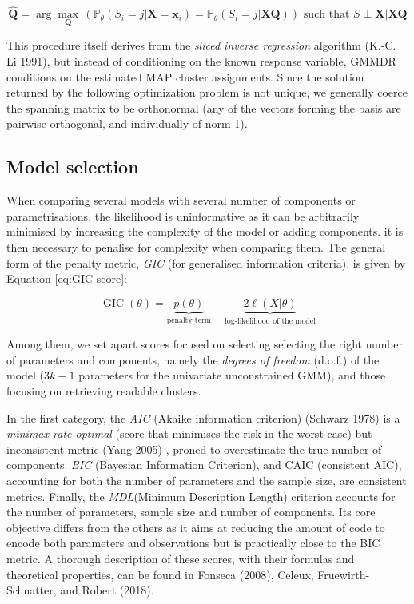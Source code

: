 \begin{equation}
 \hat{\boldsymbol{Q}} = \arg \max_{\boldsymbol{Q}} \,  \left(\mathbb{P}_{\theta} (S_i=j | \boldsymbol{X} =\boldsymbol{x}_i) = \mathbb{P}_{\theta} (S_i=j | \boldsymbol{X} \boldsymbol{Q}) \right)
\text{ such that } S \perp \boldsymbol{X} | \boldsymbol{X} \boldsymbol{Q}
    \label{eq:GMMDR}
\end{equation}

This procedure itself derives from the \emph{sliced inverse regression} algorithm (K.-C. Li 1991), but instead of conditioning on the known response variable, GMMDR conditions on the estimated MAP cluster assignments. Since the solution returned by the following optimization problem is not unique, we generally coerce the spanning matrix to be orthonormal (any of the vectors forming the basis are pairwise orthogonal, and individually of norm 1).
\color{black}

\hypertarget{model-selection}{%
\subsection{Model selection}\label{model-selection}}

When comparing several models with several number of components or
parametrisations, the likelihood is uninformative as it can be
arbitrarily minimised by increasing the complexity of the model or
adding components. it is then necessary to penalise for complexity when
comparing them. The general form of the penalty metric, \emph{GIC} (for
generalised information criteria), is given by Equation
\eqref{eq:GIC-score}:

\begin{equation}
    \operatorname{GIC} (\theta) =  \underbrace{p(\theta)}_{\text{penalty term}} - \underbrace{2 \ell (X | \theta)}_{\text{log-likelihood of the model}}
\label{eq:GIC-score}
\end{equation}

Among them, we set apart scores focused on selecting selecting the right
number of parameters and components, namely the \emph{degrees of freedom}
(d.o.f.) of the model (\(3k-1\) parameters for the univariate
unconstrained GMM), and those focusing on retrieving readable clusters.

In the first category, the \emph{AIC} (Akaike information criterion)
(Schwarz 1978) is a \emph{minimax-rate optimal} (score that minimises the risk
in the worst case) but inconsistent metric (Yang 2005) , proned to
overestimate the true number of components. \emph{BIC} (Bayesian Information
Criterion), and CAIC (consistent AIC), accounting for both the number of
parameters and the sample size, are consistent metrics. Finally, the
\emph{MDL}(Minimum Description Length) criterion accounts for the number of
parameters, sample size and number of components. Its core objective
differs from the others as it aims at reducing the amount of code to
encode both parameters and observations but is practically close to the
BIC metric. A thorough description of these scores, with their formulas
and theoretical properties, can be found in Fonseca (2008), Celeux, Fruewirth-Schnatter, and Robert (2018).

